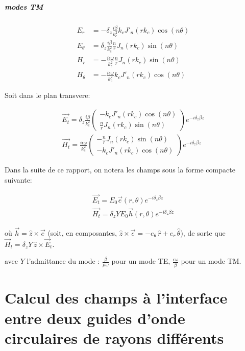 \documentclass[12pt,a4paper]{report}
\begin{document}
\paragraph{modes TM}
\begin{align}
E_r &= - \delta_z \frac{i \beta}{k_c ^ 2} k_c J'_n(r k_c)\cos(n \theta) \\
E_\theta &= \delta_z \frac{i \beta}{k_c ^ 2} \frac{n}{r} J_n(r k_c)\sin(n \theta) \\
H_r &= -\frac{i \epsilon \omega}{k_c ^ 2} \frac{n}{r} J_n(r k_c)\sin(n \theta) \\
H_\theta &= -\frac{i \epsilon \omega}{k_c ^ 2} k_c J'_n(r k_c)\cos(n \theta)
\end{align}

Soit dans le plan transvere:

\begin{align}
\vec{E_t} = \delta_z \frac{i \beta}{k_c ^ 2} \begin{pmatrix} -k_c J'_n(r k_c)\cos(n \theta) \\ \frac{n}{r} J_n(r k_c)\sin(n \theta) \end{pmatrix} e^{-i\delta_z\beta z} \\
\vec{H_t} = \frac{i \epsilon \omega}{k_c ^ 2} \begin{pmatrix} -\frac{n}{r} J_n(r k_c)\sin(n \theta) \\ -k_c J'_n(r k_c)\cos(n \theta) \end{pmatrix} e^{-i\delta_z\beta z}
\end{align}

Dans la suite de ce rapport, on notera les champs sous la forme compacte suivante:

\begin{align}
\vec{E_t} = E_0 \vec{e}(r, \theta) e^{-i\delta_z\beta z} \\
\vec{H_t} = \delta_z Y E_0 \vec{h}(r, \theta) e^{-i\delta_z\beta z}
\end{align}

où $\vec h=\hat z\times\vec e$ (soit, en composantes, $\hat z\times\vec e=-e_\theta\,\hat r+e_r\,\hat\theta$), de sorte que $\vec H_t=\delta_z Y\,\hat z\times\vec E_t$.

avec $Y$ l'admittance du mode : $\frac{\beta}{\mu \omega}$ pour un mode TE, $\frac{\epsilon \omega}{\beta}$ pour un mode TM.

\chapter{Calcul des champs à l'interface entre deux guides d'onde circulaires de rayons différents}
\end{document}

